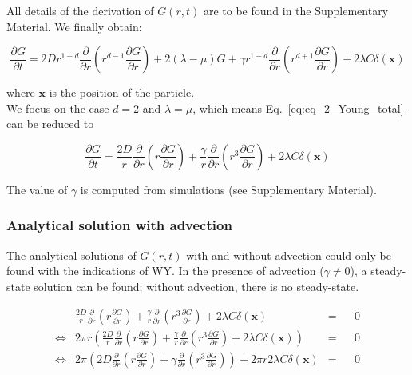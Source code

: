 All details of the derivation of $G(r,t)$ are to be found in the Supplementary Material. We finally obtain:

\begin{equation}
\frac{\partial G}{\partial t}=2Dr^{1-d}\frac{\partial}{\partial r}\left(r^{d-1}\frac{\partial G}{\partial r}\right)+2(\lambda-\mu)G+\gamma r^{1-d}\frac{\partial}{\partial r}\left(r^{d+1}\frac{\partial G}{\partial r}\right)+2\lambda C\delta(\boldsymbol{x})\label{eq:eq_2_Young_total}
\end{equation}

where $\boldsymbol{x}$ is the position of the particle. \\

We focus on the case $d=2$ and $\lambda=\mu$, which means Eq.~\ref{eq:eq_2_Young_total} can be reduced to

\begin{equation}
\frac{\partial G}{\partial t}=\frac{2D}{r}\frac{\partial}{\partial r}\left(r\frac{\partial G}{\partial r}\right)+\frac{\gamma}{r}\frac{\partial}{\partial r}\left(r^{3}\frac{\partial G}{\partial r}\right)+2\lambda C\delta(\boldsymbol{x})\label{eq:eq_2_Young_reduced}
\end{equation}

The value of $\gamma$ is computed from simulations (see Supplementary Material).

\subsubsection*{Analytical solution with advection}

The analytical solutions of $G(r,t)$ with and without advection could only be found with the indications of WY. In the presence of advection ($\gamma\neq0$), a steady-state solution
can be found; without advection, there is no steady-state. 

\begin{align}
  &  \frac{2D}{r}\frac{\partial}{\partial r}\left(r\frac{\partial G}{\partial r}\right)+\frac{\gamma}{r}\frac{\partial}{\partial r}\left(r^{3}\frac{\partial G}{\partial r}\right)+2\lambda C\delta(\boldsymbol{x})\nonumber & = & & 0 \\
\Leftrightarrow & 2\pi r\left(\frac{2D}{r}\frac{\partial}{\partial r}\left(r\frac{\partial G}{\partial r}\right)+\frac{\gamma}{r}\frac{\partial}{\partial r}\left(r^{3}\frac{\partial G}{\partial r}\right)+2\lambda C\delta(\boldsymbol{x})\right)\nonumber & = & & 0 \\
 \Leftrightarrow  & 2\pi\left(2D\frac{\partial}{\partial r}\left(r\frac{\partial G}{\partial r}\right)+\gamma\frac{\partial}{\partial r}\left(r^{3}\frac{\partial G}{\partial r}\right)\right)+2\pi r2\lambda C\delta(\boldsymbol{x}) & = & & 0\label{eq:steady_state}
\end{align}

